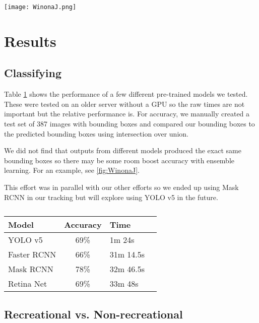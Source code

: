 \documentclass[10pt,twocolumn,letterpaper]{article}
\begin{document}
\begin{figure*}[t]
  \centering
    \texttt{[image: WinonaJ.png]}
    \caption{Red box is the value from the test data.}
    \label{fig:WinonaJ}
  \hfill
\end{figure*}
\section{Results} 

\subsection{Classifying}

Table \ref{tab:ModelPerf} shows the performance of a few different pre-trained models we tested. These were tested on an older server without a GPU so the raw times are not important but the relative performance is. For accuracy, we manually created a test set of 387 images with bounding boxes and compared our bounding boxes to the predicted bounding boxes using intersection over union.

We did not find that outputs from different models produced the exact same bounding boxes so there may be some room boost accuracy with ensemble learning. For an example, see \ref{fig:WinonaJ}.

This effort was in parallel with our other efforts so we ended up using Mask RCNN in our tracking but will explore using YOLO v5 in the future.

\begin{table}[t]
  \centering
  \begin{tabular}{@{}lc@{}lc@{}}
    \toprule
    Model & Accuracy\nobreakspace\nobreakspace\nobreakspace & \nobreakspace\nobreakspace Time \\
    \midrule
    YOLO v5\cite{pytorch_yolov5} & 69\% & 1m 24s \\
    Faster RCNN\cite{pytorch_fasterrcnn_resnet50_fpn} & 66\% & 31m 14.5s \\
    Mask RCNN\cite{pytorch_maskrcnn_resnet50_fpn} & 78\% & 32m 46.5s\\
    Retina Net\cite{pytorch_retinanet_resnet50_fpn} & 69\% & 33m 48s\\
    \bottomrule
  \end{tabular}
  \caption{}
  \label{tab:ModelPerf}
\end{table}


\subsection{Recreational vs. Non-recreational}
\end{document}
